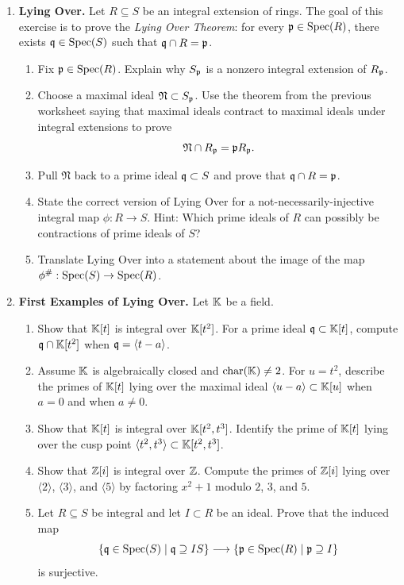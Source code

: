\documentclass[12pt,reqno]{amsart}
\begin{document}
\begin{enumerate}[leftmargin=*, series=problems]
\item \textbf{Lying Over.} Let $R\subseteq S$ be an integral extension of rings. The goal of this exercise is to prove the \emph{Lying Over Theorem}: for every $\mathfrak{p}\in\operatorname{Spec}(R)$, there exists $\mathfrak{q}\in\operatorname{Spec}(S)$ such that $\mathfrak{q}\cap R=\mathfrak{p}$.
\begin{enumerate}
    \item Fix $\mathfrak{p}\in\operatorname{Spec}(R)$. Explain why $S_{\mathfrak{p}}$ is a nonzero integral extension of $R_{\mathfrak{p}}$.
    \item Choose a maximal ideal $\mathfrak N\subset S_{\mathfrak{p}}$. Use the theorem from the previous worksheet saying that maximal ideals contract to maximal ideals under integral extensions to prove
    \[
    \mathfrak N\cap R_{\mathfrak{p}}=\mathfrak{p} R_{\mathfrak{p}}.
    \]
    \item Pull $\mathfrak N$ back to a prime ideal $\mathfrak{q}\subset S$ and prove that $\mathfrak{q}\cap R=\mathfrak{p}$.
    \item State the correct version of Lying Over for a not-necessarily-injective integral map $\phi:R\to S$. Hint: Which prime ideals of $R$ can possibly be contractions of prime ideals of $S$?
    \item Translate Lying Over into a statement about the image of the map $\phi^{\#}:\operatorname{Spec}(S)\to\operatorname{Spec}(R)$.
\end{enumerate}

\item \textbf{First Examples of Lying Over.} Let $\mathbb{K}$ be a field.
\begin{enumerate}
    \item Show that $\mathbb{K}[t]$ is integral over $\mathbb{K}[t^2]$. For a prime ideal $\mathfrak{q}\subset \mathbb{K}[t]$, compute $\mathfrak{q}\cap \mathbb{K}[t^2]$ when $\mathfrak{q}=\langle t-a\rangle$.
    \item Assume $\mathbb{K}$ is algebraically closed and $\operatorname{char}(\mathbb{K})\neq 2$. For $u=t^2$, describe the primes of $\mathbb{K}[t]$ lying over the maximal ideal $\langle u-a\rangle\subset \mathbb{K}[u]$ when $a=0$ and when $a\neq 0$.
    \item Show that $\mathbb{K}[t]$ is integral over $\mathbb{K}[t^2,t^3]$. Identify the prime of $\mathbb{K}[t]$ lying over the cusp point $\langle t^2,t^3\rangle\subset \mathbb{K}[t^2,t^3]$.
    \item Show that $\mathbb{Z}[i]$ is integral over $\mathbb{Z}$. Compute the primes of $\mathbb{Z}[i]$ lying over $\langle 2\rangle$, $\langle 3\rangle$, and $\langle 5\rangle$ by factoring $x^2+1$ modulo $2$, $3$, and $5$.
    \item Let $R\subseteq S$ be integral and let $I\subset R$ be an ideal. Prove that the induced map
    \[
    \{\mathfrak{q}\in\operatorname{Spec}(S)\mid \mathfrak{q}\supseteq IS\}\longrightarrow \{\mathfrak{p}\in\operatorname{Spec}(R)\mid \mathfrak{p}\supseteq I\}
    \]
    is surjective.
\end{enumerate}

\end{enumerate}
\end{document}
